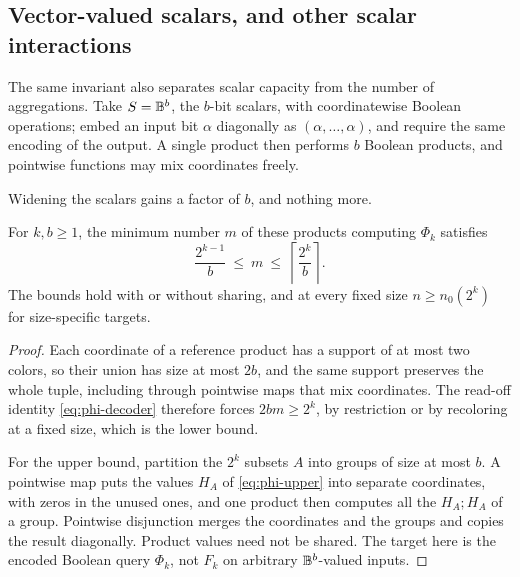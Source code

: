 \subsection{Vector-valued scalars, and other scalar interactions}\label{app:scalars}
The same invariant also separates scalar capacity from the number of
aggregations. Take $S=\mathbb B^b$, the $b$-bit scalars, with coordinatewise
Boolean operations; embed an input bit $\alpha$ diagonally as
$(\alpha,\ldots,\alpha)$, and require the same encoding of the output. A
single product then performs $b$ Boolean products, and pointwise functions
may mix coordinates freely.

Widening the scalars gains a factor of $b$, and nothing more.
\begin{proposition}\label{prop:width}
For $k,b\ge1$, the minimum number $m$ of these products computing $\Phi_k$
satisfies
\[
 \frac{2^{k-1}}b\ \le\ m\ \le\ \left\lceil\frac{2^k}b\right\rceil.
\]
The bounds hold with or without sharing, and at every fixed size
$n\ge n_0(2^k)$ for size-specific targets.
\end{proposition}
\begin{proof}
Each coordinate of a reference product has a support of at most two colors, so their
union has size at most $2b$, and the same support preserves the whole tuple,
including through pointwise maps that mix coordinates. The read-off
identity \eqref{eq:phi-decoder} therefore forces $2bm\ge2^k$, by restriction
or by
recoloring at a fixed size, which is the lower bound.

For the upper bound, partition the $2^k$ subsets $A$ into groups of size at
most $b$. A pointwise map puts the values $H_A$ of \eqref{eq:phi-upper} into
separate coordinates, with zeros in the unused ones, and one product then
computes all the $H_A;H_A$ of a group. Pointwise disjunction merges the
coordinates and the groups and copies the result diagonally. Product values
need not be shared. The target here is the encoded Boolean query $\Phi_k$,
not $F_k$ on arbitrary $\mathbb B^b$-valued inputs.
\end{proof}

